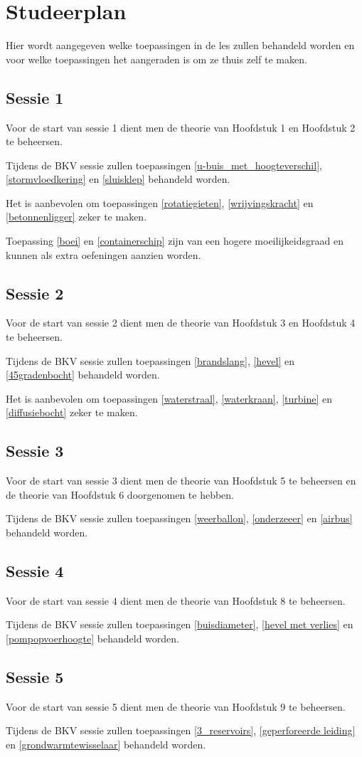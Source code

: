 \chapter{Studeerplan}
Hier wordt aangegeven welke toepassingen in de les zullen behandeld worden en voor welke toepassingen het aangeraden is om ze thuis zelf te maken.
	\section*{Sessie 1}
Voor de start van sessie 1 dient men de theorie van Hoofdstuk 1 en Hoofdstuk 2 te beheersen.

Tijdens de BKV sessie zullen toepassingen \ref{u-buis_met_hoogteverschil}, \ref{stormvloedkering} en \ref{sluisklep} behandeld worden.

Het is aanbevolen om toepassingen \ref{rotatiegieten}, \ref{wrijvingskracht} en \ref{betonnenligger} zeker te maken.

Toepassing \ref{boei} en \ref{containerschip} zijn van een hogere moeilijkeidsgraad en kunnen als extra oefeningen aanzien worden.
	
	\section*{Sessie 2}
Voor de start van sessie 2 dient men de theorie van Hoofdstuk 3 en Hoofdstuk 4 te beheersen.

Tijdens de BKV sessie zullen toepassingen \ref{brandslang}, \ref{hevel} en \ref{45gradenbocht} behandeld worden.

Het is aanbevolen om toepassingen \ref{waterstraal}, \ref{waterkraan}, \ref{turbine} en \ref{diffusiebocht} zeker te maken.

	\section*{Sessie 3}
Voor de start van sessie 3 dient men de theorie van Hoofdstuk 5 te beheersen en de theorie van Hoofdstuk 6 doorgenomen te hebben.

Tijdens de BKV sessie zullen toepassingen \ref{weerballon}, \ref{onderzeeer} en \ref{airbus} behandeld worden.

	\section*{Sessie 4}
Voor de start van sessie 4 dient men de theorie van Hoofdstuk 8 te beheersen.

Tijdens de BKV sessie zullen toepassingen \ref{buisdiameter}, \ref{hevel met verlies} en \ref{pompopvoerhoogte} behandeld worden.
	
	\section*{Sessie 5}
Voor de start van sessie 5 dient men de theorie van Hoofdstuk 9 te beheersen.

Tijdens de BKV sessie zullen toepassingen \ref{3_reservoirs}, \ref{geperforeerde leiding} en \ref{grondwarmtewisselaar} behandeld worden.